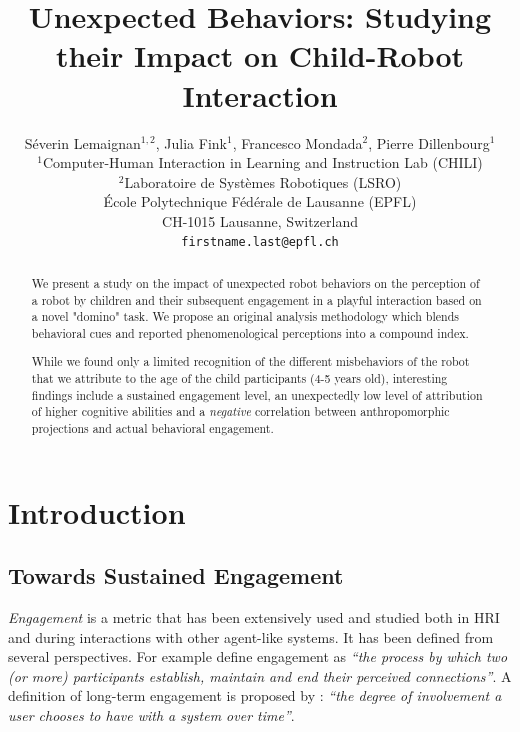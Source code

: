 \documentclass[letterpaper, 10pt, conference]{ieeeconf}
\title{\LARGE \bf
Unexpected Behaviors: Studying their Impact on Child-Robot Interaction
}
\author{
    S\'{e}verin Lemaignan$^{1,2}$, Julia Fink$^{1}$, Francesco Mondada$^{2}$, Pierre
    Dillenbourg$^{1}$\\
$^{1}$Computer-Human Interaction in Learning and Instruction Lab (CHILI) \\
$^{2}$Laboratoire de Systèmes Robotiques (LSRO) \\
École Polytechnique F\'{e}d\'{e}rale de Lausanne (EPFL) \\
CH-1015 Lausanne, Switzerland \\
{\tt\small firstname.last@epfl.ch}
}
\begin{document}
\sloppy %
\maketitle
\begin{abstract}

We present a study on the impact of unexpected robot behaviors on the
perception of a robot by children and their subsequent engagement in a playful
interaction based on a novel "domino" task.
We propose an original analysis methodology which blends behavioral cues and
reported phenomenological perceptions into a compound index.

While we found only a limited recognition of the different misbehaviors of the
robot that we attribute to the age of the child participants (4-5 years old),
interesting findings include a sustained engagement level, an unexpectedly low
level of attribution of higher cognitive abilities and a \emph{negative}
correlation between anthropomorphic projections and actual behavioral
engagement.

\end{abstract}
\section{Introduction}
\subsection{Towards Sustained Engagement}

\emph{Engagement} is a metric that has been extensively used and studied both
in HRI and during interactions with other agent-like systems. It has been
defined from several perspectives. For example \cite{sidner_where_2004} define
engagement as \textit{``the process by which two (or more) participants
establish, maintain and end their perceived connections''}. A definition of
long-term engagement is proposed by \cite{bickmore_maintaining_2010}:
\textit{``the degree of involvement a user chooses to have with a system over
time''}.
\end{document}
